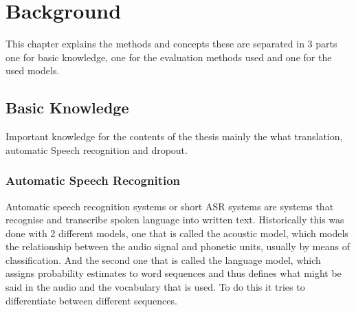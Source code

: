 \chapter{Background}
\label{ch:background}
This chapter explains the methods and concepts these are separated in 3 parts one for basic knowledge, one for the evaluation methods used and one for the used models. 

\section{Basic Knowledge}
Important knowledge for the contents of the thesis mainly the what translation, automatic Speech recognition and dropout.

\subsection{Automatic Speech Recognition}
Automatic speech recognition systems or short ASR systems are systems that recognise and transcribe spoken language into written text.
Historically this was done with 2 different models, one that is called the acoustic model, which models the relationship between the audio signal and phonetic units, usually by means of classification. 
And the second one that is called the language model, which assigns probability estimates to word sequences and thus defines what might be said in the audio and the vocabulary that is used.  
To do this it tries to differentiate between different sequences. \cite{understandingasr}

